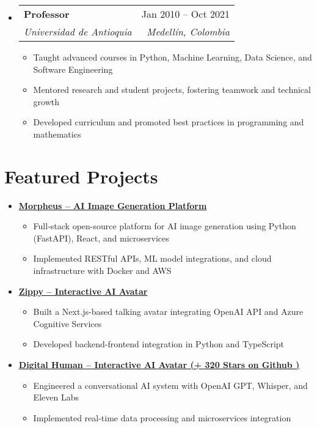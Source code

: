 \documentclass[letterpaper,11pt]{article}
\makeatletter
\newcommand{\resumeSubheading}[4]{
  \vspace{-2pt}
  \item[]
  \begin{tabular*}{\textwidth}{@{\extracolsep{\fill}}l r}
    \textbf{#1} & #2 \\
    \textit{#3} & \textit{#4} \\
  \end{tabular*}
  \vspace{-5pt}
}
\newcommand{\normalfaExternalLink}{{\mdseries\faExternalLink}}
\makeatother
\begin{document}
\begin{itemize}[leftmargin=0pt, itemindent=0pt, label={}]
\resumeSubheading
{Professor}{Jan 2010 -- Oct 2021}
{Universidad de Antioquia}{Medellín, Colombia}
\begin{itemize}[leftmargin=*]
    \item Taught advanced courses in Python, Machine Learning, Data Science, and Software Engineering
    \item Mentored research and student projects, fostering teamwork and technical growth
    \item Developed curriculum and promoted best practices in programming and mathematics
\end{itemize}
\end{itemize}

\section{Featured Projects}
\begin{itemize}[leftmargin=*]
    \item \textbf{\href{https://github.com/Monadical-SAS/Morpheus}{Morpheus -- AI Image Generation Platform \normalfaExternalLink}}
    \begin{itemize}
        \item Full-stack open-source platform for AI image generation using Python (FastAPI), React, and microservices
        \item Implemented RESTful APIs, ML model integrations, and cloud infrastructure with Docker and AWS
    \end{itemize}
    \item \textbf{\href{https://github.com/asanchezyali/ai-avatar}{Zippy -- Interactive AI Avatar \normalfaExternalLink}}
    \begin{itemize}
        \item Built a Next.js-based talking avatar integrating OpenAI API and Azure Cognitive Services
        \item Developed backend-frontend integration in Python and TypeScript
    \end{itemize}
    \item \textbf{\href{https://github.com/asanchezyali/talking-avatar-with-ai}{Digital Human -- Interactive AI Avatar (+
        320 Stars on Github )\normalfaExternalLink}}
    \begin{itemize}
        \item Engineered a conversational AI system with OpenAI GPT, Whisper, and Eleven Labs
        \item Implemented real-time data processing and microservices integration
    \end{itemize}
\end{itemize}
\end{document}
